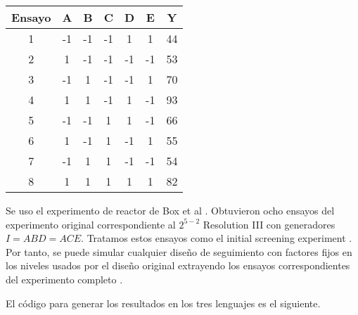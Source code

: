 \begin{center}
	\begin{tabular}{cccccc|c}
		Ensayo & A & B & C & D & E & Y \\
		\hline
		1 & -1 & -1 & -1 & 1 & 1 & 44 \\
		
		2 & 1 & -1 & -1 & -1 & -1 & 53 \\
		
		3 & -1 & 1 & -1 & -1 & 1 & 70 \\
		
		4 & 1 & 1 & -1 & 1 & -1 & 93 \\
		
		5 & -1 & -1 & 1 & 1 & -1 & 66 \\

		6 & 1 & -1 & 1 & -1 & 1 & 55 \\
		
		7 & -1 & 1 & 1 & -1 & -1 & 54 \\
		
		8 & 1 & 1 & 1 & 1 & 1 & 82 \\	
		
	\end{tabular}
	 \label{data_table2}
\end{center}


Se uso el experimento de reactor de Box et al . Obtuvieron ocho ensayos del experimento original correspondiente al $2^{5-2}$ Resolution III  con generadores $I = ABD = ACE$. Tratamos estos ensayos como el initial screening experiment . Por tanto, se puede simular cualquier diseño de seguimiento con factores fijos en los niveles usados por el diseño original extrayendo los ensayos correspondientes del experimento completo .

El código para generar los resultados en los tres lenguajes es el siguiente.

